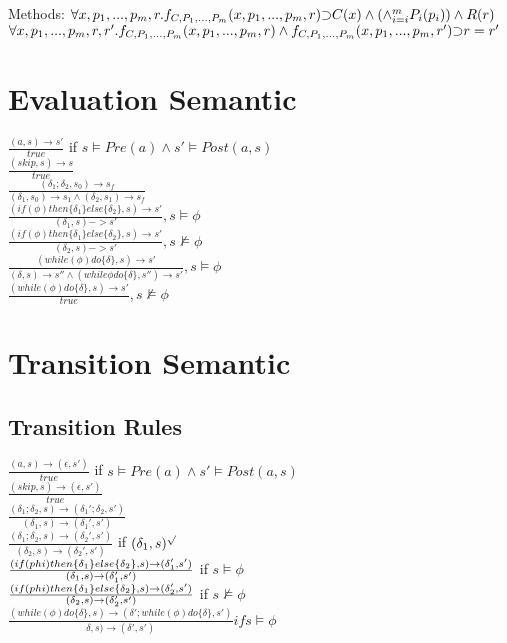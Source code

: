 \documentclass{article}
\DeclareRobustCommand{\impl}{\text{\reflectbox{$\subset$}}}
\begin{document}
Methods: \newline
\sloppy %
$\forall x,p_1,...,p_m,r . f_{C,P_1,...,P_m}(x,p_1,...,p_m,r) \impl C(x) \wedge (\wedge_{i=i}^{m}P_i(p_i))\wedge R(r) $ \newline
$\forall x,p_1,...,p_m,r,r' . f_{C,P_1,...,P_m}(x,p_1,...,p_m,r) \wedge f_{C,P_1,...,P_m}(x,p_1,...,p_m,r') \impl r=r' $ \\

\section{Evaluation Semantic}

$\frac{(a,s)\rightarrow s'}{true}$ if $s \models Pre(a) \wedge s'\models Post(a,s)$\\ [2mm]
$\frac{(skip,s)\rightarrow s}{true}$ \\[2mm]
$\frac{(\delta_1;\delta_2,s_0)\rightarrow s_f}{(\delta_1,s_0)\rightarrow s_1 \wedge (\delta_2,s_1)\rightarrow s_f }$ \\[2mm]
$\frac{( if (\phi) then\{ \delta_1\} else \{ \delta_2\} ,s)\rightarrow s'}{(\delta_1,s)->s'}, s\models\phi$ \\[2mm]
$\frac{( if (\phi) then \{ \delta_1\} else \{ \delta_2\} ,s)\rightarrow s'}{(\delta_2,s)->s'}, s\not\models\phi$ \\[2mm]
$\frac{(while (\phi) do\{\delta\}, s)\rightarrow s'}{(\delta,s)\rightarrow s'' \wedge (while \phi do\{\delta\}, s'')\rightarrow s' }, s\models\phi$\\[2mm]
$\frac{(while (\phi) do\{\delta\}, s)\rightarrow s'}{true}, s\not\models\phi$\\

\section{Transition Semantic}
\subsection{Transition Rules}
$\frac{(a,s)\rightarrow(\epsilon,s')}{true}$ if $s \models Pre(a) \wedge s'\models Post(a,s)$ \\[2mm]
$\frac{(skip,s)\rightarrow(\epsilon,s')}{true}$ \\[2mm]
$\frac{(\delta_1;\delta_2,s)\rightarrow(\delta_1';\delta_2,s')}{(\delta_1,s)\rightarrow(\delta_1',s')}$ \\[2mm]
$\frac{(\delta_1;\delta_2,s)\rightarrow(\delta_2',s')}{(\delta_2,s)\rightarrow(\delta_2',s')}$ if $(\delta_1,s)^{\surd}$\\[2mm]
$\frac{(if(\\phi)then\{\delta_1\}else\{\delta_2\},s)\rightarrow(\delta_1',s')}{ (\delta_1,s)\rightarrow(\delta_1',s')}$ if $s\models\phi$ \\[2mm]
$\frac{(if(\\phi)then\{\delta_1\}else\{\delta_2\},s)\rightarrow(\delta_2',s')}{ (\delta_2,s)\rightarrow(\delta_2',s')}$ if $s\not\models\phi$ \\[2mm]
$\frac{(while(\phi)do\{\delta\},s)\rightarrow(\delta';while(\phi)do\{\delta\},s')}{\delta,s)\rightarrow(\delta',s')} if s\models\phi$
\end{document}

